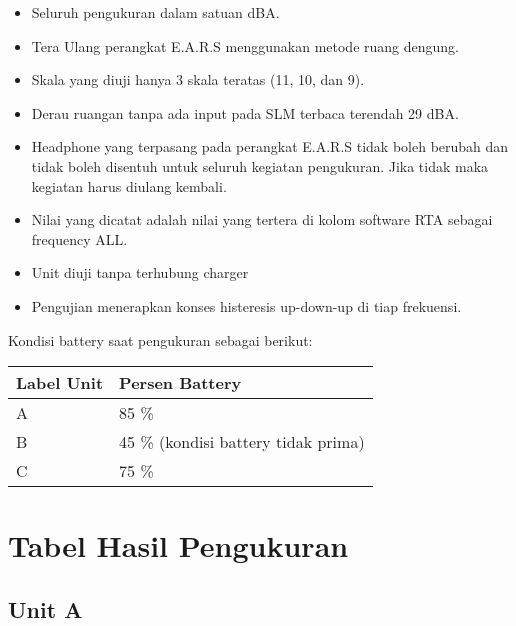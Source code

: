 \documentclass{article} %
\begin{document}
	\begin{itemize}
		\item Seluruh pengukuran dalam satuan dBA.

		\item Tera Ulang perangkat E.A.R.S menggunakan metode ruang dengung.

		\item Skala yang diuji hanya 3 skala teratas (11, 10, dan 9).

		\item Derau ruangan tanpa ada input pada SLM terbaca terendah 29 dBA.

		\item Headphone yang terpasang pada perangkat E.A.R.S tidak boleh berubah dan tidak boleh disentuh untuk
		seluruh kegiatan pengukuran. Jika tidak maka kegiatan harus diulang kembali.

		\item Nilai yang dicatat adalah nilai yang tertera di kolom software RTA sebagai frequency ALL.

		\item Unit diuji tanpa terhubung charger

		\item Pengujian menerapkan konses histeresis up-down-up di tiap frekuensi.
	\end{itemize}

	Kondisi battery saat pengukuran sebagai berikut:

	\begin{table}[!ht]
		\begin{tabular}{|l|l|}
			\hline
			\textbf{Label Unit}	& \textbf{Persen Battery}   \\ \hline
			A	& 85 \%   \\ \hline
			B	& 45 \% (kondisi battery tidak prima)   \\ \hline
			C	& 75 \%   \\ \hline
		\end{tabular}
	\end{table}

	\newpage
	\section{Tabel Hasil Pengukuran}

	\subsection{Unit A}
\end{document}
